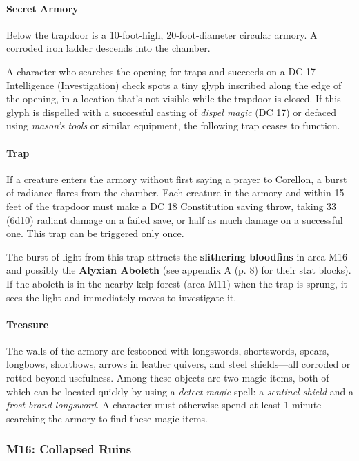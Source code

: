 \documentclass[a4paper, 11pt, bg=full, twocolumn, nooutline]{dndbook}
\begin{document}
\paragraph{Secret Armory}

Below the trapdoor is a 10-foot-high, 20-foot-diameter circular armory. A corroded iron ladder descends into the chamber.

A character who searches the opening for traps and succeeds on a DC 17 Intelligence (Investigation) check spots a tiny glyph inscribed along the edge of the opening, in a location that's not visible while the trapdoor is closed. If this glyph is dispelled with a successful casting of \textit{dispel magic} (DC 17) or defaced using \textit{mason's tools} or similar equipment, the following trap ceases to function.

\paragraph{Trap}

If a creature enters the armory without first saying a prayer to Corellon, a burst of radiance flares from the chamber. Each creature in the armory and within 15 feet of the trapdoor must make a DC 18 Constitution saving throw, taking 33 (6d10) radiant damage on a failed save, or half as much damage on a successful one. This trap can be triggered only once.

The burst of light from this trap attracts the \textbf{slithering bloodfins} in area M16 and possibly the \textbf{Alyxian Aboleth} (see appendix A (p. 8) for their stat blocks). If the aboleth is in the nearby kelp forest (area M11) when the trap is sprung, it sees the light and immediately moves to investigate it.

\paragraph{Treasure}

The walls of the armory are festooned with longswords, shortswords, spears, longbows, shortbows, arrows in leather quivers, and steel shields---all corroded or rotted beyond usefulness. Among these objects are two magic items, both of which can be located quickly by using a \textit{detect magic} spell: a \textit{sentinel shield} and a \textit{frost brand longsword}. A character must otherwise spend at least 1 minute searching the armory to find these magic items.

\subsubsection{M16: Collapsed Ruins}
\end{document}
